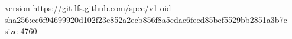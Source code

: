 version https://git-lfs.github.com/spec/v1
oid sha256:ec6f94699920d102f23c852a2ecb856f8a5cdac6feed85bef5529bb2851a3b7c
size 4760
